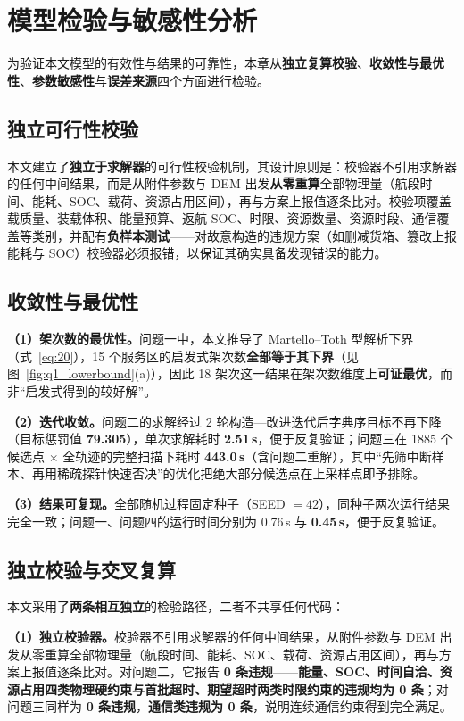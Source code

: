 \section{模型检验与敏感性分析}

为验证本文模型的有效性与结果的可靠性，本章从\textbf{独立复算校验}、\textbf{收敛性与最优性}、\textbf{参数敏感性}与\textbf{误差来源}四个方面进行检验。

\subsection{独立可行性校验}

本文建立了\textbf{独立于求解器}的可行性校验机制，其设计原则是：校验器不引用求解器的任何中间结果，而是从附件参数与 DEM 出发\textbf{从零重算}全部物理量（航段时间、能耗、SOC、载荷、资源占用区间），再与方案上报值逐条比对。校验项覆盖载质量、装载体积、能量预算、返航 SOC、时限、资源数量、资源时段、通信覆盖等类别，并配有\textbf{负样本测试}——对故意构造的违规方案（如删减货箱、篡改上报能耗与 SOC）校验器必须报错，以保证其确实具备发现错误的能力。

\subsection{收敛性与最优性}

\textbf{（1）架次数的最优性。}问题一中，本文推导了 Martello--Toth 型解析下界（式~\eqref{eq:20}），15 个服务区的启发式架次数\textbf{全部等于其下界}（见图~\ref{fig:q1_lowerbound}(a)），因此 18 架次这一结果在架次数维度上\textbf{可证最优}，而非“启发式得到的较好解”。

\textbf{（2）迭代收敛。}问题二的求解经过 2 轮构造—改进迭代后字典序目标不再下降（目标惩罚值 \textbf{79.305}），单次求解耗时 \textbf{2.51\,s}，便于反复验证；问题三在 1885 个候选点 $\times$ 全轨迹的完整扫描下耗时 \textbf{443.0\,s}（含问题二重解），其中“先筛中断样本、再用稀疏探针快速否决”的优化把绝大部分候选点在上采样点即予排除。

\textbf{（3）结果可复现。}全部随机过程固定种子（SEED $=42$），同种子两次运行结果完全一致；问题一、问题四的运行时间分别为 0.76\,s 与 \textbf{0.45\,s}，便于反复验证。

\subsection{独立校验与交叉复算}

本文采用了\textbf{两条相互独立}的检验路径，二者不共享任何代码：

\textbf{（1）独立校验器。}校验器不引用求解器的任何中间结果，从附件参数与 DEM 出发从零重算全部物理量（航段时间、能耗、SOC、载荷、资源占用区间），再与方案上报值逐条比对。对问题二，它报告 \textbf{0 条违规}——\textbf{能量、SOC、时间自洽、资源占用四类物理硬约束与首批超时、期望超时两类时限约束的违规均为 0 条}；对问题三同样为 \textbf{0 条违规}，\textbf{通信类违规为 0 条}，说明连续通信约束得到完全满足。

